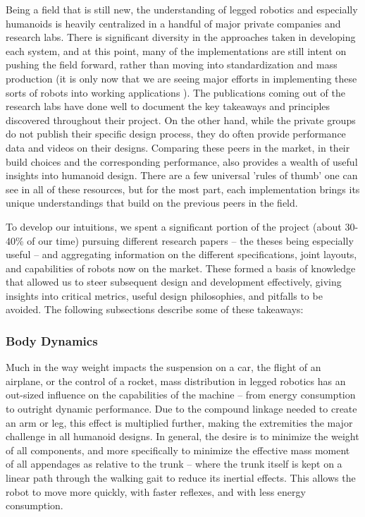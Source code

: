 \documentclass{article}
\begin{document}
Being a field that is still new, the understanding of legged robotics and especially humanoids is heavily centralized in a handful of major private companies and research labs. There is significant diversity in the approaches taken in developing each system, and at this point, many of the implementations are still intent on pushing the field forward, rather than moving into standardization and mass production (it is only now that we are seeing major efforts in implementing these sorts of robots into working applications \cite{unitree2016} \cite{agilityProducts}). The publications coming out of the research labs have done well to document the key takeaways and principles discovered throughout their project. On the other hand, while the private groups do not publish their specific design process, they do often provide performance data and videos on their designs. Comparing these peers in the market, in their build choices and the corresponding performance, also provides a wealth of useful insights into humanoid design. There are a few universal 'rules of thumb' one can see in all of these resources, but for the most part, each implementation brings its unique understandings that build on the previous peers in the field.

To develop our intuitions, we spent a significant portion of the project (about 30-40\% of our time) pursuing different research papers -- the theses being especially useful -- and aggregating information on the different specifications, joint layouts, and capabilities of robots now on the market. These formed a basis of knowledge that allowed us to steer subsequent design and development effectively, giving insights into critical metrics, useful design philosophies, and pitfalls to be avoided.
The following subsections describe some of these takeaways:

\subsubsection{Body Dynamics}

Much in the way weight impacts the suspension on a car, the flight of an airplane, or the control of a rocket, mass distribution in legged robotics has an out-sized influence on the capabilities of the machine -- from energy consumption to outright dynamic performance. Due to the compound linkage needed to create an arm or leg, this effect is multiplied further, making the extremities the major challenge in all humanoid designs. In general, the desire is to minimize the weight of all components, and more specifically to minimize the effective mass moment of all appendages as relative to the trunk -- where the trunk itself is kept on a linear path through the walking gait to reduce its inertial effects. This allows the robot to move more quickly, with faster reflexes, and with less energy consumption.
\end{document}
